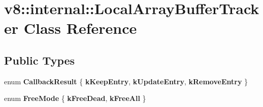\hypertarget{classv8_1_1internal_1_1LocalArrayBufferTracker}{}\section{v8\+:\+:internal\+:\+:Local\+Array\+Buffer\+Tracker Class Reference}
\label{classv8_1_1internal_1_1LocalArrayBufferTracker}
\subsection*{Public Types}
\begin{DoxyCompactItemize}
\item 
\mbox{\label{classv8_1_1internal_1_1LocalArrayBufferTracker_a421d335bef4740e36057ef54fd0b8c78}} 
enum {\bfseries Callback\+Result} \{ {\bfseries k\+Keep\+Entry}, 
{\bfseries k\+Update\+Entry}, 
{\bfseries k\+Remove\+Entry}
 \}
\item 
\mbox{\label{classv8_1_1internal_1_1LocalArrayBufferTracker_a10e149f4ff2ab00a0024ab4e63d218bb}} 
enum {\bfseries Free\+Mode} \{ {\bfseries k\+Free\+Dead}, 
{\bfseries k\+Free\+All}
 \}
\end{DoxyCompactItemize}
